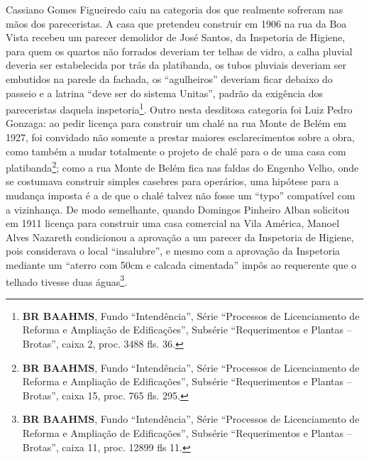 Cassiano Gomes Figueiredo caiu na categoria dos que realmente sofreram nas mãos dos pareceristas. A casa que pretendeu construir em 1906 na rua da Boa Vista recebeu um parecer demolidor de José Santos, da Inspetoria de Higiene, para quem os quartos não forrados deveriam ter telhas de vidro, a calha pluvial deveria ser estabelecida por trás da platibanda, os tubos pluviais deveriam ser embutidos na parede da fachada, os ``agulheiros'' deveriam ficar debaixo do passeio e a latrina ``deve ser do sistema Unitas'', padrão da exigência dos pareceristas daquela inspetoria\footnote{\textbf{BR BAAHMS}, Fundo ``Intendência'', Série ``Processos de Licenciamento de Reforma e Ampliação de Edificações'', Subsérie ``Requerimentos e Plantas – Brotas'', caixa 2, proc. 3488 fls. 36.}. Outro nesta desditosa categoria foi Luiz Pedro Gonzaga: ao pedir licença para construir um chalé na rua Monte de Belém em 1927, foi convidado não somente a prestar maiores esclarecimentos sobre a obra, como também a mudar totalmente o projeto de chalé para o de uma casa com platibanda\footnote{\textbf{BR BAAHMS}, Fundo ``Intendência'', Série ``Processos de Licenciamento de Reforma e Ampliação de Edificações'', Subsérie ``Requerimentos e Plantas – Brotas'', caixa 15, proc. 765 fls. 295.}; como a rua Monte de Belém fica nas faldas do Engenho Velho, onde se costumava construir simples casebres para operários, uma hipótese para a mudança imposta é a de que o chalé talvez não fosse um ``typo'' compatível com a vizinhança. De modo semelhante, quando Domingos Pinheiro Alban solicitou em 1911 licença para construir uma casa comercial na Vila América, Manoel Alves Nazareth condicionou a aprovação a um parecer da Inspetoria de Higiene, pois considerava o local ``insalubre'', e mesmo com a aprovação da Inspetoria mediante um ``aterro com 50cm e calcada cimentada'' impôs ao requerente que o telhado tivesse duas águas\footnote{\textbf{BR BAAHMS}, Fundo ``Intendência'', Série ``Processos de Licenciamento de Reforma e Ampliação de Edificações'', Subsérie ``Requerimentos e Plantas – Brotas'', caixa 11, proc. 12899 fls 11.}. 

